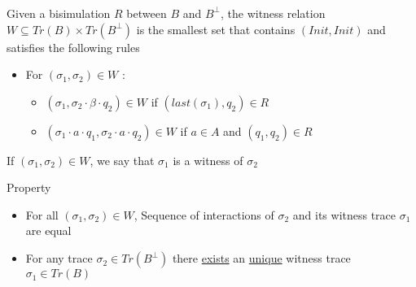 \documentclass{beamer}
\begin{document}
\begin{frame}
\frametitle{}
 \framesubtitle{}
\small
\begin{definition}[Witness]
\scriptsize
Given a bisimulation $R$ between $B$ and $B^\perp$, the witness relation $W\subseteq Tr(B)\times Tr(B^\perp)$ is the smallest set that contains $(Init,Init)$ and satisfies the following rules
 
\begin{itemize}
\item[] For $(\sigma_1,\sigma_2)\in W$ :

\begin{itemize}
\scriptsize
\item $(\sigma_1,\sigma_2\cdot\beta\cdot q_2)\in W$ if $(last(\sigma_1),q_2)\in R$
\item $(\sigma_1\cdot a\cdot q_1,\sigma_2\cdot a\cdot q_2)\in W$ if $a\in A$ and $(q_1,q_2)\in R$ 

\end{itemize}
\end{itemize}

If $(\sigma_1,\sigma_2)\in W$, we say that $\sigma_1$ is a witness of $\sigma_2$
\end{definition}
\begin{block}{Property}%
\scriptsize
\begin{itemize}
\item For all $(\sigma_1,\sigma_2)\in W$, Sequence of interactions of $\sigma_2$ and its witness trace $\sigma_1$ are equal
\item For any trace $\sigma_2\in Tr(B^\perp)$ there \underline{exists} an \underline{unique} witness trace $\sigma_1\in Tr(B)$ 
\end{itemize}
\end{block}


\end{frame}

\end{document}
